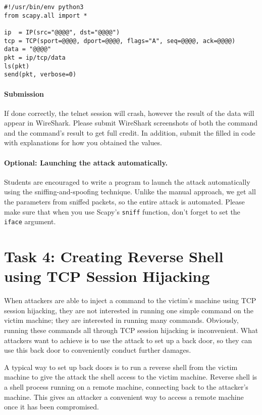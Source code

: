 \begin{lstlisting}
#!/usr/bin/env python3
from scapy.all import *

ip  = IP(src="@@@@", dst="@@@@")
tcp = TCP(sport=@@@@, dport=@@@@, flags="A", seq=@@@@, ack=@@@@)
data = "@@@@"
pkt = ip/tcp/data
ls(pkt)
send(pkt, verbose=0)
\end{lstlisting}

\paragraph{Submission} If done correctly, the telnet session will crash, however the result of the data will appear in WireShark.
Please submit WireShark screenshots of both the command and the command's result to get full credit.
In addition, submit the filled in code with explanations for how you obtained the values.


\paragraph{Optional: Launching the attack automatically.}
Students are encouraged to write a program to launch the
attack automatically using the sniffing-and-spoofing technique.
Unlike the manual approach, we get all the parameters
from sniffed packets, so the entire attack is automated.
Please make sure that when you
use Scapy's \texttt{sniff} function, don't forget to
set the \texttt{iface} argument.





\section{Task 4: Creating Reverse Shell using TCP Session Hijacking}

When attackers are able to inject a command to the victim's machine using
TCP session hijacking, they are not interested in running one simple
command on the victim machine; they are interested in running many
commands. Obviously, running these commands all through TCP session
hijacking is inconvenient. What attackers want to achieve is to use the
attack to set up a back door, so they can use this
back door to conveniently conduct further damages.

A typical way to set up back doors is to run a reverse shell from the
victim machine to give the attack the shell access to the victim machine.
Reverse shell is a shell process running on a remote machine, connecting
back to the attacker's machine. This gives an attacker a convenient way to
access a remote machine once it has been compromised. 


